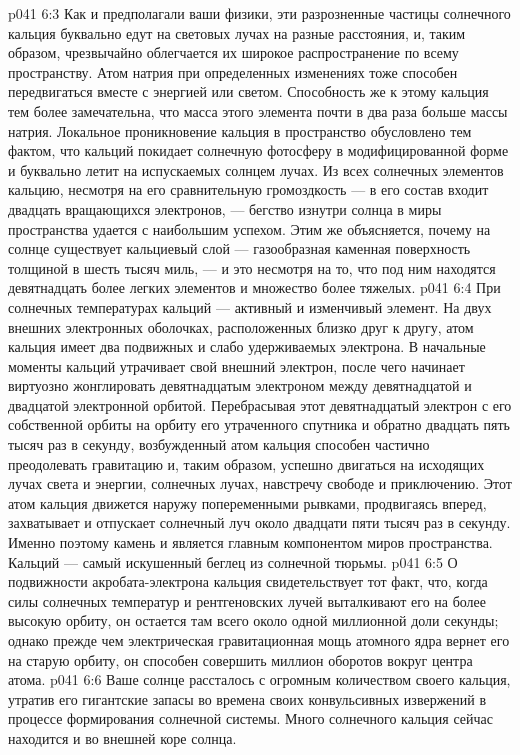 \vs p041 6:3 \pc Как и предполагали ваши физики, эти разрозненные частицы солнечного кальция буквально едут на световых лучах на разные расстояния, и, таким образом, чрезвычайно облегчается их широкое распространение по всему пространству. Атом натрия при определенных изменениях тоже способен передвигаться вместе с энергией или светом. Способность же к этому кальция тем более замечательна, что масса этого элемента почти в два раза больше массы натрия. Локальное проникновение кальция в пространство обусловлено тем фактом, что кальций покидает солнечную фотосферу в модифицированной форме и буквально летит на испускаемых солнцем лучах. Из всех солнечных элементов кальцию, несмотря на его сравнительную громоздкость --- в его состав входит двадцать вращающихся электронов, --- бегство изнутри солнца в миры пространства удается с наибольшим успехом. Этим же объясняется, почему на солнце существует кальциевый слой --- газообразная каменная поверхность толщиной в шесть тысяч миль, --- и это несмотря на то, что под ним находятся девятнадцать более легких элементов и множество более тяжелых.
\vs p041 6:4 При солнечных температурах кальций --- активный и изменчивый элемент. На двух внешних электронных оболочках, расположенных близко друг к другу, атом кальция имеет два подвижных и слабо удерживаемых электрона. В начальные моменты кальций утрачивает свой внешний электрон, после чего начинает виртуозно жонглировать девятнадцатым электроном между девятнадцатой и двадцатой электронной орбитой. Перебрасывая этот девятнадцатый электрон с его собственной орбиты на орбиту его утраченного спутника и обратно двадцать пять тысяч раз в секунду, возбужденный атом кальция способен частично преодолевать гравитацию и, таким образом, успешно двигаться на исходящих лучах света и энергии, солнечных лучах, навстречу свободе и приключению. Этот атом кальция движется наружу попеременными рывками, продвигаясь вперед, захватывает и отпускает солнечный луч около двадцати пяти тысяч раз в секунду. Именно поэтому камень и является главным компонентом миров пространства. Кальций --- самый искушенный беглец из солнечной тюрьмы.
\vs p041 6:5 О подвижности акробата\hyp{}электрона кальция свидетельствует тот факт, что, когда силы солнечных температур и рентгеновских лучей выталкивают его на более высокую орбиту, он остается там всего около одной миллионной доли секунды; однако прежде чем электрическая гравитационная мощь атомного ядра вернет его на старую орбиту, он способен совершить миллион оборотов вокруг центра атома.
\vs p041 6:6 \pc Ваше солнце рассталось с огромным количеством своего кальция, утратив его гигантские запасы во времена своих конвульсивных извержений в процессе формирования солнечной системы. Много солнечного кальция сейчас находится и во внешней коре солнца.
